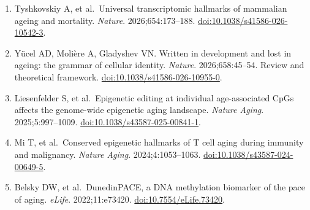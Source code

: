 \documentclass[
  11pt,
  letterpaper,
]{article}
\begin{document}
\begin{enumerate}
  perturbation response prediction beyond systematic variation.
  \emph{Nature Biotechnology}. 2026;44:1050--1059. Published online
  2025.
  \href{https://doi.org/10.1038/s41587-025-02777-8}{doi:10.1038/s41587-025-02777-8}.
\item
  Tyshkovskiy A, et al.~Universal transcriptomic hallmarks of mammalian
  ageing and mortality. \emph{Nature}. 2026;654:173--188.
  \href{https://doi.org/10.1038/s41586-026-10542-3}{doi:10.1038/s41586-026-10542-3}.
\item
  Yücel AD, Molière A, Gladyshev VN. Written in development and lost in
  ageing: the grammar of cellular identity. \emph{Nature}.
  2026;658:45--54. Review and theoretical framework.
  \href{https://doi.org/10.1038/s41586-026-10955-0}{doi:10.1038/s41586-026-10955-0}.
\item
  Liesenfelder S, et al.~Epigenetic editing at individual age-associated
  CpGs affects the genome-wide epigenetic aging landscape. \emph{Nature
  Aging}. 2025;5:997--1009.
  \href{https://doi.org/10.1038/s43587-025-00841-1}{doi:10.1038/s43587-025-00841-1}.
\item
  Mi T, et al.~Conserved epigenetic hallmarks of T cell aging during
  immunity and malignancy. \emph{Nature Aging}. 2024;4:1053--1063.
  \href{https://doi.org/10.1038/s43587-024-00649-5}{doi:10.1038/s43587-024-00649-5}.
\item
  Belsky DW, et al.~DunedinPACE, a DNA methylation biomarker of the pace
  of aging. \emph{eLife}. 2022;11:e73420.
  \href{https://doi.org/10.7554/eLife.73420}{doi:10.7554/eLife.73420}.
\end{enumerate}
\end{document}
